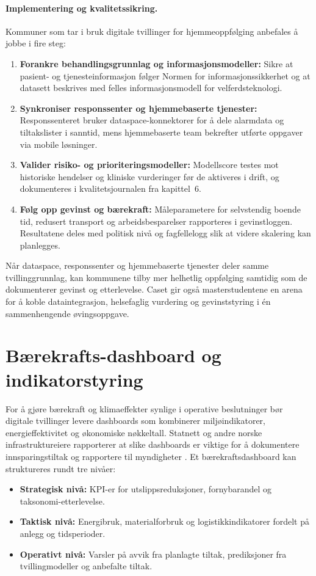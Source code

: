 \paragraph{Implementering og kvalitetssikring.} Kommuner som tar i bruk digitale tvillinger for hjemmeoppfølging anbefales å jobbe i fire steg:
\begin{enumerate}
    \item \textbf{Forankre behandlingsgrunnlag og informasjonsmodeller:} Sikre at pasient- og tjenesteinformasjon følger Normen for informasjonssikkerhet og at datasett beskrives med felles informasjonsmodell for velferdsteknologi.\citep{helsedir2020dho}
    \item \textbf{Synkroniser responssenter og hjemmebaserte tjenester:} Responssenteret bruker dataspace-konnektorer for å dele alarmdata og tiltakslister i sanntid, mens hjemmebaserte team bekrefter utførte oppgaver via mobile løsninger.\citep{ks2024responssenter}
    \item \textbf{Valider risiko- og prioriteringsmodeller:} Modellscore testes mot historiske hendelser og kliniske vurderinger før de aktiveres i drift, og dokumenteres i kvalitetsjournalen fra kapittel~6.
    \item \textbf{Følg opp gevinst og bærekraft:} Måleparametere for selvstendig boende tid, redusert transport og arbeidsbesparelser rapporteres i gevinstloggen. Resultatene deles med politisk nivå og fagfellelogg slik at videre skalering kan planlegges.
\end{enumerate}

Når dataspace, responssenter og hjemmebaserte tjenester deler samme tvillinggrunnlag, kan kommunene tilby mer helhetlig oppfølging samtidig som de dokumenterer gevinst og etterlevelse. Caset gir også masterstudentene en arena for å koble dataintegrasjon, helsefaglig vurdering og gevinststyring i én sammenhengende øvingsoppgave.

\section{Bærekrafts-dashboard og indikatorstyring}
For å gjøre bærekraft og klimaeffekter synlige i operative beslutninger bør digitale tvillinger levere dashboards som kombinerer
miljøindikatorer, energieffektivitet og økonomiske nøkkeltall. Statnett og andre norske infrastruktureiere rapporterer at slike
dashboards er viktige for å dokumentere innsparingstiltak og rapportere til myndigheter \citep{statnett2024baerekraft}. Et
bærekraftsdashboard kan struktureres rundt tre nivåer:
\begin{itemize}
    \item \textbf{Strategisk nivå:} KPI-er for utslippsreduksjoner, fornybarandel og taksonomi-etterlevelse.
    \item \textbf{Taktisk nivå:} Energibruk, materialforbruk og logistikkindikatorer fordelt på anlegg og tidsperioder.
    \item \textbf{Operativt nivå:} Varsler på avvik fra planlagte tiltak, prediksjoner fra tvillingmodeller og anbefalte tiltak.
\end{itemize}


